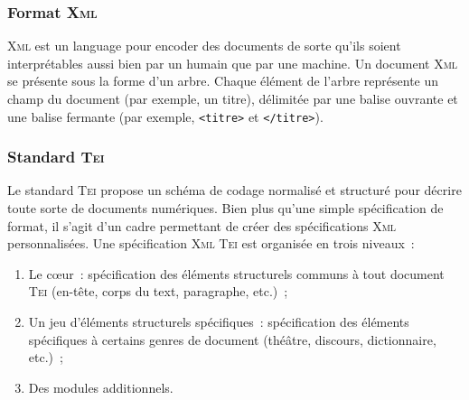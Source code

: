       \subsubsection{Format \textsc{Xml}}
      \label{subsubsec:main-automatic_evaluation_of_keyphrase_annotation-methodology-data_format-xml}
        \textsc{Xml} est un language pour encoder des documents de sorte qu'ils
        soient interprétables aussi bien par un humain que par une machine. Un
        document \textsc{Xml} se présente sous la forme d'un arbre. Chaque
        élément de l'arbre représente un champ du document (par exemple, un
        titre), délimitée par une balise ouvrante et une balise fermante (par
        exemple, \texttt{<titre>} et \texttt{</titre>}).


      \subsubsection{Standard \textsc{Tei}}
      \label{subsubsec:main-automatic_evaluation_of_keyphrase_annotation-methodology-data_format-tei}
        Le standard \textsc{Tei} propose un schéma de codage normalisé et
        structuré pour décrire toute sorte de documents numériques. Bien plus
        qu'une simple spécification de format, il s'agit d'un cadre permettant
        de créer des spécifications \textsc{Xml} personnalisées. Une
        spécification \textsc{Xml} \textsc{Tei} est organisée en trois niveaux~:
        \begin{enumerate}
          \item{Le c\oe{}ur~: spécification des éléments structurels communs à
                tout document \textsc{Tei} (en-tête, corps du text, paragraphe,
                etc.)~;}
          \item{Un jeu d'éléments structurels spécifiques~: spécification des
                éléments spécifiques à certains genres de document (théâtre,
                discours, dictionnaire, etc.)~;}
          \item{Des modules additionnels.}
        \end{enumerate}


